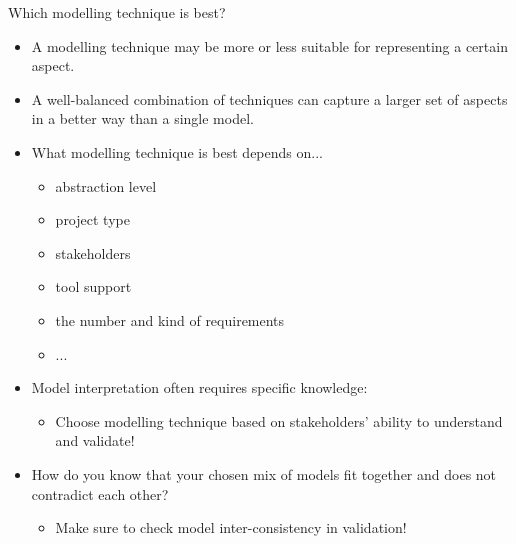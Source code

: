 
\begin{Slide}{Which modelling technique is best? }

\begin{itemize}
\item A modelling technique may be more or less suitable for  representing a certain aspect.

\item A well-balanced combination of techniques can capture a larger set of aspects in a better way than a single model.

\item What modelling technique is best depends on...
\begin{itemize}
\item abstraction level
\item project type
\item stakeholders
\item tool support
\item the number and kind of requirements
\item ...

\end{itemize}
\item Model interpretation often requires specific knowledge: 
\begin{itemize}
\item Choose modelling technique based on stakeholders' ability to understand and validate!

\end{itemize}
\item How do you know that your chosen mix of models fit together and does not contradict each other?
\begin{itemize}
\item Make sure to check model inter-consistency in validation!

\end{itemize}
\end{itemize}
\end{Slide}